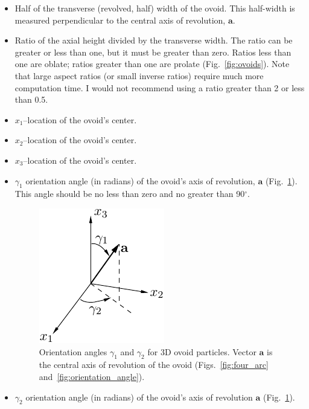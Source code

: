 \documentclass[letterpaper,11pt]{article}
\begin{document}
\begin{itemize}
\item
Half of the transverse (revolved, half) width of the ovoid.  
This half-width is measured perpendicular
to the central axis of revolution, $\mathbf{a}$.
\item
Ratio of the axial height divided
by the transverse width.  
The ratio can be greater or less than one, but it must be greater than zero.
Ratios less than one are oblate; ratios greater than one are prolate
(Fig.~\ref{fig:ovoids}).
Note that large aspect ratios (or small inverse ratios) require much more
computation time.  I would not recommend using a ratio greater than 2 or
less than 0.5.
\item
$x_{1}$--location of the ovoid's center.
\item
$x_{2}$--location of the ovoid's center.
\item
$x_{3}$--location of the ovoid's center.
\item
$\gamma_{1}$ orientation angle (in radians) of the ovoid's axis
of revolution, $\mathbf{a}$ (Fig.~\ref{fig:coordinates}).  
This angle should be no less than zero and no greater than
90$^{\circ}$.
\begin{figure}
  \centering
  \includegraphics{Figures/coordinates}
  \caption{Orientation angles $\gamma_{1}$ and $\gamma_{2}$ 
           for 3D ovoid particles.
           Vector $\mathbf{a}$ is the central axis of revolution of the ovoid
           (Figs.~\ref{fig:four_arc} and~\ref{fig:orientation_angle}).}
  \label{fig:coordinates}
\end{figure}
\item
$\gamma_{2}$ orientation angle (in radians) of the ovoid's axis
of revolution $\mathbf{a}$ (Fig.~\ref{fig:coordinates}).
\end{itemize}
%
%
\end{document}
